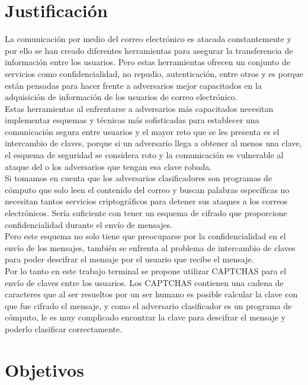 \section{Justificación}
La comunicación por medio del correo electrónico es atacada constantemente y por ello se han creado diferentes herramientas para asegurar la transferencia de información entre los usuarios. Pero estas herramientas ofrecen un conjunto de servicios como confidencialidad, no repudio, autenticación, entre otros y es porque están pensadas para hacer frente a adversarios mejor capacitados en la adquisición de información de los usuarios de correo electrónico.\\
Estas herramientas al enfrentarse a adversarios más capacitados necesitan implementar esquemas y técnicas más sofisticadas para establecer una comunicación segura entre usuarios y el mayor reto que se les presenta es el intercambio de claves, porque si un adversario llega a obtener al menos una clave, el esquema de seguridad se considera roto y la comunicación es vulnerable al ataque del o los adversarios que tengan esa clave robada.\\
 Si tomamos en cuenta que los adversarios clasificadores son programas de cómputo que solo leen el contenido del correo y buscan palabras específicas no necesitan tantos servicios criptográficos para detener sus ataques a los correos electrónicos. Sería suficiente con tener un esquema de cifrado que proporcione confidencialidad durante el envío de mensajes.\\
Pero este esquema no solo tiene que preocuparse por la confidencialidad en el envío de los mensajes, también se enfrenta al problema de intercambio de claves para poder descifrar el mensaje por el usuario que recibe el mensaje.\\
Por lo tanto en este trabajo terminal se propone utilizar CAPTCHAS para el envío de claves entre los usuarios. Los CAPTCHAS contienen una cadena de caracteres que al ser resueltos por un ser humano es posible calcular la clave con que fue cifrado el mensaje, y como el adversario clasificador es un programa de cómputo, le es muy complicado encontrar la clave para descifrar el mensaje y poderlo clasificar correctamente.\\

\section{Objetivos} %



